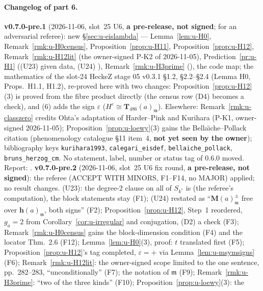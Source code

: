 \documentclass[11pt]{article}
\newcommand{\hcusp}{\mathbf{h}}                   %
\newcommand{\Tu}{\mathbf{T}}                      %
\begin{document}
\paragraph{Changelog of part 6.} \textbf{v0.7.0-pre.1} (2026-11-06, slot~25 U6, \textbf{a pre-release, not signed}; for an adversarial referee): new \S\ref{sec:u-eislambda} ---
Lemma~\ref{lem:u-H0}, Remark~\ref{rmk:u-H0census}, Proposition~\ref{prop:u-H11}, Proposition~\ref{prop:u-H12}, Remark~\ref{rmk:u-H12lit} (the owner-signed P-K2 of 2026-11-05),
Prediction~\ref{pr:u-H1} ((U23) \PROVED{} given data, (U24) \CONJ), Remark~\ref{rmk:u-H3prime} (\COMP), the code map; the mathematics of the slot-24 HeckeZ stage 05 v0.3.1 \S1.2,
\S2.2--\S2.4 (Lemma H0, Props.~H1.1, H1.2), re-proved here with two changes: Proposition~\ref{prop:u-H12}(3) is proved from the fibre product directly (the census row (D4) becomes a
check), and (6) adds the sign $\varepsilon$ ($H^{\varepsilon}\cong\Tu_{486}(a)_{\mathfrak m}$). Elsewhere: Remark~\ref{rmk:u-classzero} credits Ohta's adaptation of Harder--Pink and
Kurihara (P-K1, owner-signed 2026-11-05); Proposition~\ref{prop:u-loewy}(3) gains the Bella\"\i che--Pollack citation (phenomenology catalogue \S11 item~4, \textbf{not yet seen by the
owner}); bibliography keys \texttt{kurihara1993}, \texttt{calegari\_eisdef}, \texttt{bellaiche\_pollack}, \texttt{bruns\_herzog\_cm}. No statement, label, number or status tag of
0.6.0 moved. Report: .
\textbf{v0.7.0-pre.2} (2026-11-06, slot~25 U6 fix round, \textbf{a pre-release, not signed}): the referee  (ACCEPT WITH MINORS, F1--F14, no
MAJOR) applied; no result changes. (U23): the degree-$2$ clause on all of $S_{k^{*}}$ is \COMP{} (the referee's computation), the block statements stay \PROVED{} (F1); (U24) restated as
``$\mathbf M(a)^{\pm}_{\mathfrak m}$ free over $\hcusp(a)_{\mathfrak m}$, both signs'' (F2); Proposition~\ref{prop:u-H12}, Step~1 reordered, $g_a=2$ from Corollary~\ref{cor:u-irregular} and
conjugation, (D2) a check (F3); Remark~\ref{rmk:u-H0census} gains the block-dimension condition (F4) and the locator Thm.~2.6 (F12); Lemma~\ref{lem:u-H0}(3), proof: $t$ translated
first (F5); Proposition~\ref{prop:u-H12}'s tag completed, $\varepsilon=+$ via Lemma~\ref{lem:u-msymsigns} (F6); Remark~\ref{rmk:u-H12lit}: the owner-signed scope limited to the one sentence,
pp.~282--283, ``unconditionally'' (F7); the notation of $\mathfrak m$ (F9); Remark~\ref{rmk:u-H3prime}: ``two of the three kinds'' (F10); Proposition~\ref{prop:u-loewy}(3): the
\end{document}
